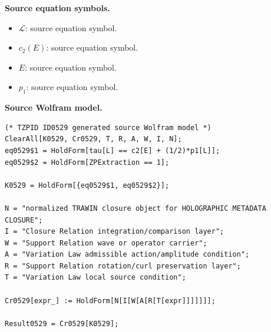 \begin{minipage}[t]{0.49\linewidth}
\begingroup
\small
\raggedright
\textbf{Source equation symbols.}\par
\begin{itemize}[leftmargin=1.35em,itemsep=1pt,topsep=1pt,parsep=0pt]
    \item $\mathcal{L}$: source equation symbol.
    \item $c_2(E)$: source equation symbol.
    \item $E$: source equation symbol.
    \item $p_1$: source equation symbol.
\end{itemize}
\endgroup
\end{minipage}\hfill
\begin{minipage}[t]{0.47\linewidth}
\begingroup
\scriptsize
\raggedright
\textbf{Source Wolfram model.}\par
\begin{Verbatim}[fontsize=\tiny,breaklines=true,breakanywhere=true]
(* TZPID ID0529 generated source Wolfram model *)
ClearAll[K0529, Cr0529, T, R, A, W, I, N];
eq0529$1 = HoldForm[tau[L] == c2[E] + (1/2)*p1[L]];
eq0529$2 = HoldForm[ZPExtraction == 1];

K0529 = HoldForm[{eq0529$1, eq0529$2}];

N = "normalized TRAWIN closure object for HOLOGRAPHIC METADATA CLOSURE";
I = "Closure Relation integration/comparison layer";
W = "Support Relation wave or operator carrier";
A = "Variation Law admissible action/amplitude condition";
R = "Support Relation rotation/curl preservation layer";
T = "Variation Law local source condition";

Cr0529[expr_] := HoldForm[N[I[W[A[R[T[expr]]]]]]];

Result0529 = Cr0529[K0529];
\end{Verbatim}
\endgroup
\end{minipage}


